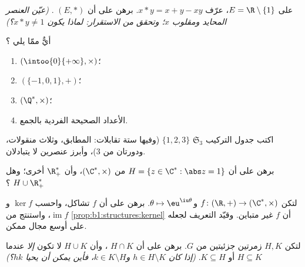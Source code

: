 \begin{exercise}[$\star$]\label{exo:b1:structures:1}
على $E = \R \setminus \{1\}$، عرّف $x * y = x + y - xy$. برهن على أن
$(E, *)$ . \emph{(عيّن العنصر المحايد ومقلوب
$x$؛ وتحقق من الاستقرار: لماذا يكون $x * y \neq 1$؟)}
\end{exercise}

\begin{exercise}[$\star$]\label{exo:b1:structures:2}
أيٌّ ممّا يلي ؟
\begin{enumerate}
  \item $(\intoo{0}{+\infty}, \times)$؛
  \item $(\{-1, 0, 1\}, +)$؛
  \item $(\Q^*, \times)$؛
  \item {} الأعداد الصحيحة الفردية بالجمع.
\end{enumerate}
\end{exercise}

\begin{exercise}[$\star$]\label{exo:b1:structures:3}
اكتب جدول التركيب  $\mathfrak{S}_3$
 $\{1,2,3\}$ (وفيها ستة تقابلات:  المطابق، وثلاث منقولات، ودورتان
من  $3$)، وأبرز عنصرين لا يتبادلان.
\end{exercise}

\begin{exercise}[$\star$]\label{exo:b1:structures:4}
برهن على أن $H = \{z \in \C^* : \abs z = 1\}$  من $(\C^*,
\times)$، وأن $\R_+^*$  أخرى؛ وهل $H \cup \R_+^*$ ؟
\end{exercise}

\begin{exercise}[$\star\star$]\label{exo:b1:structures:5}
لتكن $f \colon (\R, +) \to (\C^*, \times)$ و$\theta \mapsto
\eu^{\iu\theta}$. برهن على أن $f$ تشاكل، واحسب $\ker f$ و
$\operatorname{im} f$، واستنتج من
\cref{prop:b1:structures:kernel} أن $f$ غير متباين. وقيّد
 التعريف لجعله  على أوسع مجال ممكن.
\end{exercise}

\begin{exercise}[$\star\star$]\label{exo:b1:structures:6}
لتكن $H, K$ زمرتين جزئيتين من $G$. برهن على أن $H \cap K$ ،
وأن $H \cup K$ لا تكون  \emph{إلا} عندما $H \subseteq K$ أو
$K \subseteq H$. \emph{(إذا كان $h \in H \setminus K$ و$k \in K
\setminus H$، فأين يمكن أن يحيا $hk$؟)}
\end{exercise}


